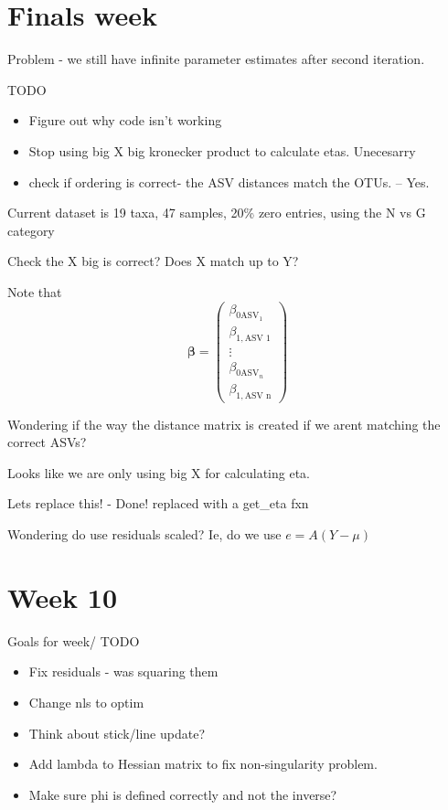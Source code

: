 \documentclass[10pt]{article}
\begin{document}
\section{Finals week}

Problem - we still have infinite parameter estimates after second iteration.


TODO
\begin{itemize}
  \item Figure out why code isn't working


  \item Stop using big X big kronecker product to calculate etas. Unecesarry
  \item check if ordering is correct- the ASV distances match the OTUs. -- Yes.
\end{itemize}

Current dataset is 19 taxa, 47 samples, 20\% zero entries, using the N vs G category


Check the X big is correct? Does X match up to Y?

Note that
\[\boldsymbol\beta = \begin{pmatrix}\beta_{0\text{ASV}_1} \\ \beta_{1, \text{ASV 1}} \\ \vdots \\ \beta_{0\text{ASV}_n} \\ \beta_{1, \text{ASV n}}\end{pmatrix} \]


Wondering if the way the distance matrix is created if we arent matching the correct ASVs?



Looks like we are only using big X for calculating eta.

Lets replace this! - Done! replaced with a get\_eta fxn


Wondering do use residuals scaled?
Ie, do we use $e = A (Y - \mu)$


\section{Week 10}

Goals for week/ TODO
\begin{itemize}
  \item Fix residuals - was squaring them

  \item Change nls to optim
  \item Think about stick/line update?
  \item Add lambda to Hessian matrix to fix non-singularity problem.
  \item Make sure phi is defined correctly and not the inverse?
\end{itemize}
\end{document}
